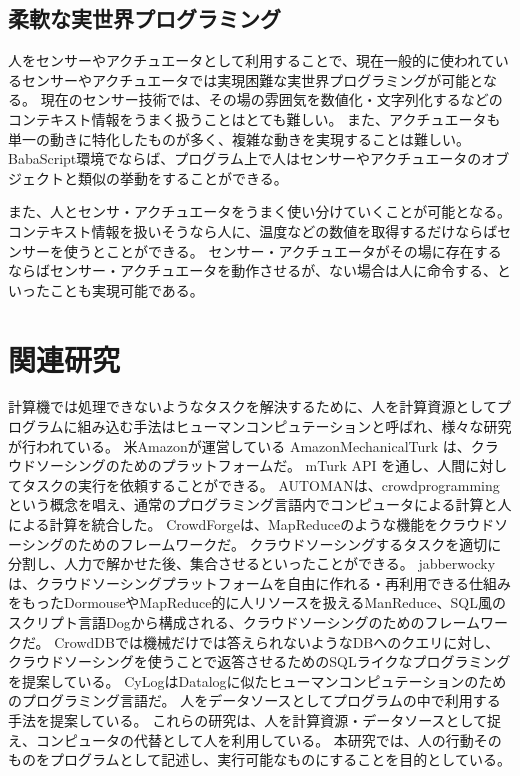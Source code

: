 \documentclass{deimj}
\begin{document}
\subsection{柔軟な実世界プログラミング}
人をセンサーやアクチュエータとして利用することで、現在一般的に使われているセンサーやアクチュエータでは実現困難な実世界プログラミングが可能となる。
現在のセンサー技術では、その場の雰囲気を数値化・文字列化するなどのコンテキスト情報をうまく扱うことはとても難しい。
また、アクチュエータも単一の動きに特化したものが多く、複雑な動きを実現することは難しい。
BabaScript環境でならば、プログラム上で人はセンサーやアクチュエータのオブジェクトと類似の挙動をすることができる。

また、人とセンサ・アクチュエータをうまく使い分けていくことが可能となる。
コンテキスト情報を扱いそうなら人に、温度などの数値を取得するだけならばセンサーを使うとことができる。
センサー・アクチュエータがその場に存在するならばセンサー・アクチュエータを動作させるが、ない場合は人に命令する、といったことも実現可能である。


\section{関連研究}
計算機では処理できないようなタスクを解決するために、人を計算資源としてプログラムに組み込む手法はヒューマンコンピュテーション\cite{humancomputation}と呼ばれ、様々な研究が行われている。
米Amazonが運営している AmazonMechanicalTurk\cite{amt} は、クラウドソーシングのためのプラットフォームだ。
mTurk API を通し、人間に対してタスクの実行を依頼することができる。
AUTOMAN\cite{automan}は、crowdprogrammingという概念を唱え、通常のプログラミング言語内でコンピュータによる計算と人による計算を統合した。
CrowdForge\cite{crowdforge}は、MapReduceのような機能をクラウドソーシングのためのフレームワークだ。
クラウドソーシングするタスクを適切に分割し、人力で解かせた後、集合させるといったことができる。
jabberwocky\cite{jabberwocky}は、クラウドソーシングプラットフォームを自由に作れる・再利用できる仕組みをもったDormouseやMapReduce的に人リソースを扱えるManReduce、SQL風のスクリプト言語Dogから構成される、クラウドソーシングのためのフレームワークだ。
CrowdDB\cite{crowddb}では機械だけでは答えられないようなDBへのクエリに対し、クラウドソーシングを使うことで返答させるためのSQLライクなプログラミングを提案している。
CyLog\cite{cylog}はDatalogに似たヒューマンコンピュテーションのためのプログラミング言語だ。
人をデータソースとしてプログラムの中で利用する手法を提案している。
これらの研究は、人を計算資源・データソースとして捉え、コンピュータの代替として人を利用している。
本研究では、人の行動そのものをプログラムとして記述し、実行可能なものにすることを目的としている。
\end{document}
